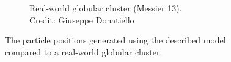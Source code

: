 \begin{figure}[htp]
\begin{subfigure}[b]{0.4\textwidth}
        \caption{Real-world globular cluster (Messier 13).\\
            Credit: Giuseppe Donatiello}
        \label{fig:messier-13}
    \end{subfigure}
    \caption{The particle positions generated using the described model compared to a real-world globular cluster.}
    \label{fig:globular-cluster-gen-vs-real}
\end{figure}